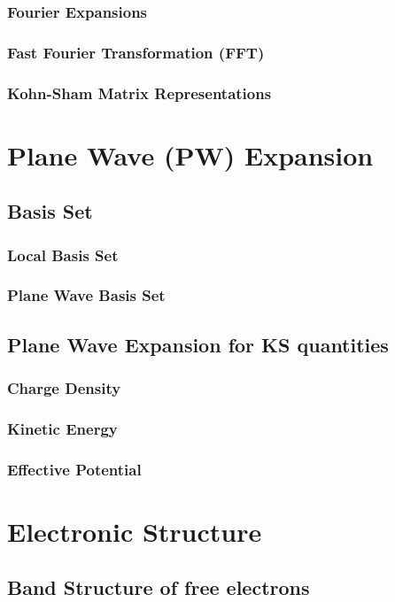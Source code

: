         \subsubsection{Fourier Expansions}
        \subsubsection{Fast Fourier Transformation (FFT)}
        \subsubsection{Kohn-Sham Matrix Representations}
\section{Plane Wave (PW) Expansion}
    \subsection{Basis Set}
        \subsubsection{Local Basis Set}
        \subsubsection{Plane Wave Basis Set}
    \subsection{Plane Wave Expansion for KS quantities}
        \subsubsection{Charge Density}
        \subsubsection{Kinetic Energy}
        \subsubsection{Effective Potential}
\section{Electronic Structure}
    \subsection{Band Structure of free electrons}
